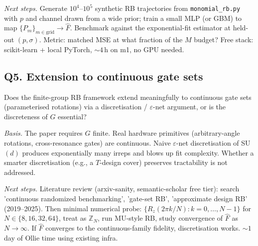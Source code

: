 \emph{Next steps.} Generate $10^4$--$10^5$ synthetic RB trajectories from \texttt{monomial\_rb.py} with $p$ and channel drawn from a wide prior; train a small MLP (or GBM) to map $\{P_m\}_{m \in \text{grid}} \to \hat F$. Benchmark against the exponential-fit estimator at held-out $(p, \sigma)$. Metric: matched MSE at what fraction of the $M$ budget? Free stack: scikit-learn + local PyTorch, $\sim 4$\,h on m1, no GPU needed.

\subsection*{Q5. Extension to continuous gate sets}
Does the finite-group RB framework extend meaningfully to continuous gate sets (parameterised rotations) via a discretisation / $\varepsilon$-net argument, or is the discreteness of $G$ essential?

\emph{Basis.} The paper requires $G$ finite. Real hardware primitives (arbitrary-angle rotations, cross-resonance gates) are continuous. Naive $\varepsilon$-net discretisation of SU$(d)$ produces exponentially many irreps and blows up fit complexity. Whether a smarter discretisation (e.g., a $T$-design cover) preserves tractability is not addressed.

\emph{Next steps.} Literature review (arxiv-sanity, semantic-scholar free tier): search 'continuous randomized benchmarking', 'gate-set RB', 'approximate design RB' (2019--2025). Then minimal numerical probe: $\{R_z(2\pi k / N) : k = 0, \dots, N-1\}$ for $N \in \{8, 16, 32, 64\}$, treat as $\mathbb{Z}_N$, run MU-style RB, study convergence of $\hat F$ as $N \to \infty$. If $\hat F$ converges to the continuous-family fidelity, discretisation works. $\sim 1$ day of Ollie time using existing infra.
